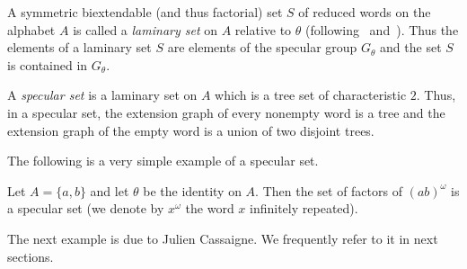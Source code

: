 \documentclass[preprint,12pt]{elsarticle}
\numberwithin{theorem}{section}
\numberwithin{equation}{section}
\numberwithin{figure}{section}
\numberwithin{table}{section}
\begin{document}
A symmetric biextendable (and thus factorial)
set $S$ of reduced words on the alphabet $A$
is called
a \emph{laminary set} on $A$ relative to $\theta$ (following~\cite{HilionCoulboisLustig2008}
and~\cite{LopezNarbel2013}). Thus the elements of a laminary set $S$
are elements of the specular group $G_\theta$ and the set $S$ is contained
in $G_\theta$.


A \emph{specular set} is a laminary set on $A$ which is a tree set of characteristic $2$. Thus, in a specular set, the extension graph of every nonempty word
is a tree and the extension graph of the empty word is a union of two
disjoint trees.
 

The following is a very simple example of a specular set.
\begin{example}\label{exampleabab}
Let $A=\{a,b\}$ and let $\theta$ be the identity on $A$. Then the set
of factors of $(ab)^\omega$ is a specular set
(we denote by $x^\omega$ the word $x$ infinitely repeated).
\end{example}
The next example is due to Julien Cassaigne. 
We frequently refer to it in next sections.
\end{document}
